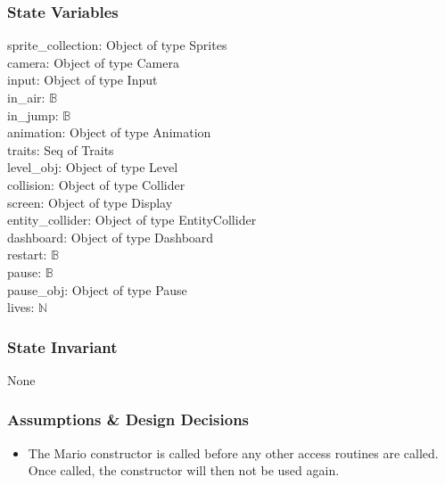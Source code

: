 \documentclass[12pt]{article}
\begin{document}
\subsubsection*{State Variables}
sprite\_collection: Object of type Sprites\\
camera: Object of type Camera\\
input: Object of type Input\\
in\_air: $\mathbb{B}$\\
in\_jump: $\mathbb{B}$\\
animation: Object of type Animation\\
traits: Seq of Traits\\
level\_obj: Object of type Level\\
collision: Object of type Collider\\
screen: Object of type Display\\
entity\_collider: Object of type EntityCollider\\
dashboard: Object of type Dashboard\\
restart: $\mathbb{B}$\\
pause: $\mathbb{B}$\\
pause\_obj: Object of type Pause\\
lives: $\mathbb{N}$\\

\subsubsection*{State Invariant}
None

\subsubsection*{Assumptions \& Design Decisions}

\begin{itemize}
    \item The Mario constructor is called before any other access routines are called. Once called, the constructor will then not be used again.
\end{itemize}
\end{document}
